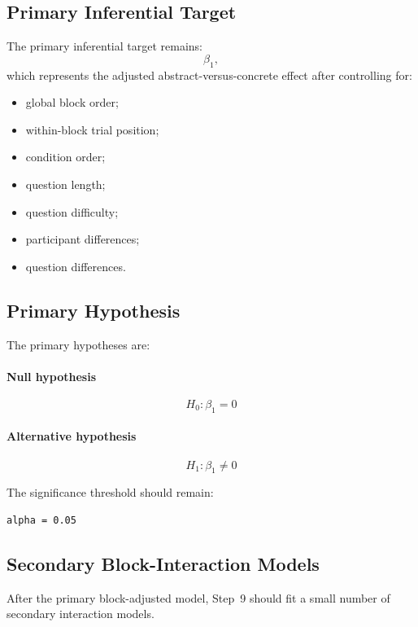 \subsection{Primary Inferential Target}
The primary inferential target remains:
\begin{equation}
\beta_1,
\end{equation}
which represents the adjusted abstract-versus-concrete effect after controlling for:
\begin{itemize}
    \item global block order;
    \item within-block trial position;
    \item condition order;
    \item question length;
    \item question difficulty;
    \item participant differences;
    \item question differences.
\end{itemize}

\subsection{Primary Hypothesis}
The primary hypotheses are:

\paragraph{Null hypothesis}
\begin{equation}
H_0: \beta_1 = 0
\end{equation}

\paragraph{Alternative hypothesis}
\begin{equation}
H_1: \beta_1 \neq 0
\end{equation}

The significance threshold should remain:
\begin{verbatim}
alpha = 0.05
\end{verbatim}

\subsection{Secondary Block-Interaction Models}
After the primary block-adjusted model, Step~9 should fit a small number of secondary interaction models.

